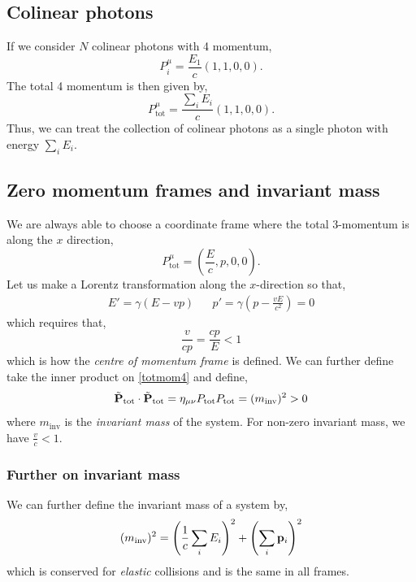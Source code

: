\documentclass{book}
\begin{document}
\subsection{Colinear photons}
If we consider $N$ colinear photons with 4 momentum,
\begin{equation}
	P_i^{\mu} = \frac{E_1}{c}(1,1,0,0).
\end{equation}
The total 4 momentum is then given by,
\begin{equation}
	P_{\text{tot}}^{\mu} = \frac{\sum_iE_i}{c}(1,1,0,0).
\end{equation}
Thus, we can treat the collection of colinear photons as a single photon with energy $\sum_i E_i$.
\subsection{Zero momentum frames and invariant mass}
We are always able to choose a coordinate frame where the total 3-momentum is along the $x$ direction,
\begin{equation}
	P_{\text{tot}}^{\mu} = \left(\frac{E}{c}, p, 0 ,0\right). \label{totmom4}
\end{equation}
Let us make a Lorentz transformation along the $x$-direction so that,
\begin{align}
	E' = \gamma(E - vp) && p' = \gamma \left(p - \frac{vE}{c^2}\right) = 0
\end{align}
which requires that,
\begin{equation}
	\frac{v}{cp} = \frac{cp}{E} < 1
\end{equation}
which is how the \textit{centre of momentum frame} is defined. We can further define take the inner product on \eqref{totmom4} and define,
\begin{equation}
	\tilde{\vb{P}}_\text{tot} \cdot \tilde{\vb{P}}_\text{tot} = \eta_{\mu\nu}P_{\text{tot}}P_{\text{tot}} = (m_{\text{inv}})^2 > 0
\end{equation}
where $m_{\text{inv}}$ is the \textit{invariant mass} of the system. For non-zero invariant mass, we have $\frac{v}{c} < 1$.
\subsubsection{Further on invariant mass}
We can further define the invariant mass of a system by,
\begin{equation}
	(m_{\text{inv}})^2 = \left(\frac{1}{c}\sum_i E_i\right)^2 + \left(\sum_i \vb{p}_i\right)^2
\end{equation}
which is conserved for \textit{elastic} collisions and is the same in all frames. 
\end{document}
